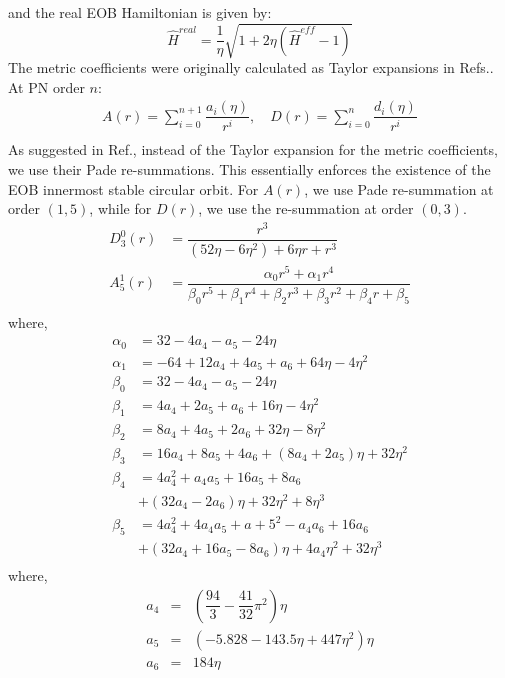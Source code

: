 \documentclass[aps,
prd,
amsmath,
amssymb,
twocolumn,
floatfix,
groupedaddress]{revtex4-1}
\newcommand{\Sum}{\displaystyle\sum\limits}
\begin{document}
and the real EOB Hamiltonian is given by:
\begin{equation}
\hat{H}^{real} = \dfrac{1}{\eta} \sqrt{1 + 2\eta (\hat{H}^{eff} - 1)} 
\end{equation}
The metric coefficients were originally calculated as Taylor expansions in  Refs.\cite{EOBOriginalBuonannoDamour,PadeAD}. At PN order $n$:
\begin{eqnarray}
A(r) = \Sum^{n+1}_{i=0} \dfrac{a_i (\eta)}{r^i},\quad
D(r) = \Sum^{n}_{i=0} \dfrac{d_i (\eta)}{r^i}\\
\end{eqnarray}
As suggested in Ref.\cite{PadeAD}, instead of the Taylor expansion for the metric coefficients, we use their Pade re-summations. This essentially enforces the existence of the EOB innermost stable circular orbit. For $A(r)$, we use Pade re-summation at order $(1,5)$, while for $D(r)$, we use the re-summation  at order $(0,3)$.
\begin{eqnarray}
D^0_3(r) &= \dfrac{r^3}{(52\eta - 6\eta^2) + 6\eta r + r^3}\\
A^1_5(r) &= \dfrac{\alpha_0 r^5 + \alpha_1 r^4}{\beta_0 r^5 + \beta_1 r^4 + \beta_2 r^3 + \beta_3 r^2 + \beta_4 r +\beta_5}\\
\end{eqnarray}
where, 
\begin{align*}
\alpha_0 &= 32 - 4a_4 - a_5 - 24\eta\\
\alpha_1 &= -64 + 12a_4 + 4a_5 + a_6 + 64\eta - 4\eta^2\\
\beta_0 &= 32 - 4a_4 - a_5 - 24\eta\\
\beta_1 &= 4a_4 + 2a_5 + a_6 + 16\eta - 4\eta^2\\
\beta_2 &= 8a_4 + 4a_5 + 2a_6 + 32\eta - 8\eta^2\\
\beta_3 &= 16a_4 + 8a_5 + 4a_6 + \left(8a_4 + 2a_5\right)\eta + 32\eta^2\\
\beta_4 &= 4a_4^2 + a_4a_5 + 16a_5 + 8a_6\\ 
             &+ \left(32a_4 - 2a_6\right)\eta + 32\eta^2 + 8\eta^3\\
\beta_5 &= 4a_4^2 + 4a_4a_5 + a+5^2 - a_4a_6 + 16a_6\\
             &+ \left(32a_4 + 16a_5 - 8a_6\right)\eta + 4a_4\eta^2 + 32\eta^3\\
\end{align*}
where,
\begin{eqnarray}
a_4 &=& \left(\dfrac{94}{3} - \dfrac{41}{32}\pi^2\right)\eta\\
a_5 &=& \left(-5.828 - 143.5\eta + 447\eta^2\right)\eta\\
a_6 &=& 184\eta\\
\end{eqnarray}
\end{document}
